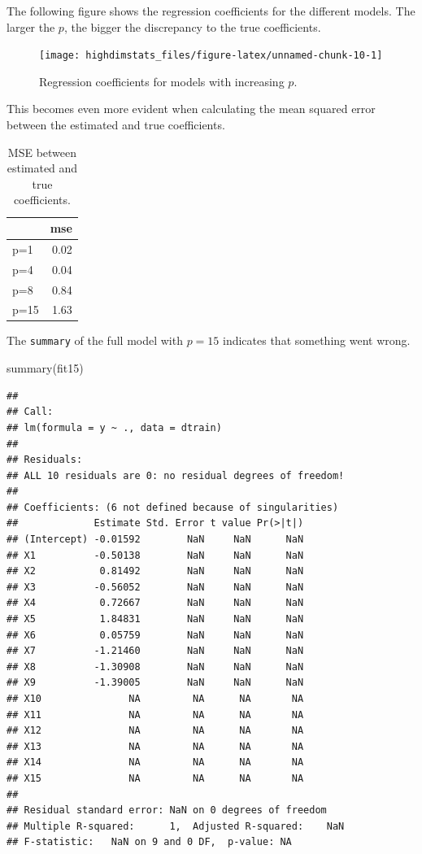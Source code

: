 \documentclass[
]{book}
\newenvironment{Shaded}{\begin{snugshade}}{\end{snugshade}}
\newcommand{\FunctionTok}[1]{\textcolor[rgb]{0.00,0.00,0.00}{#1}}
\newcommand{\NormalTok}[1]{#1}
\begin{document}
The following figure shows the regression coefficients for the different models. The larger the \(p\), the bigger the discrepancy to the true coefficients.

\begin{figure}

{\centering \texttt{[image: highdimstats\_files/figure-latex/unnamed-chunk-10-1]} 

}

\caption{Regression coefficients for models with increasing $p$.}\label{fig:unnamed-chunk-10}
\end{figure}

This becomes even more evident when calculating the mean squared error between the estimated and true coefficients.

\begin{table}

\caption{\label{tab:unnamed-chunk-11}MSE between estimated and true coefficients.}
\centering
\begin{tabular}[t]{lr}
\toprule
  & mse\\
\midrule
p=1 & 0.02\\
p=4 & 0.04\\
p=8 & 0.84\\
p=15 & 1.63\\
\bottomrule
\end{tabular}
\end{table}

The \texttt{summary} of the full model with \(p=15\) indicates that something went wrong.

\begin{Shaded}
\begin{Highlighting}[]
\FunctionTok{summary}\NormalTok{(fit15)}
\end{Highlighting}
\end{Shaded}

\begin{verbatim}
## 
## Call:
## lm(formula = y ~ ., data = dtrain)
## 
## Residuals:
## ALL 10 residuals are 0: no residual degrees of freedom!
## 
## Coefficients: (6 not defined because of singularities)
##             Estimate Std. Error t value Pr(>|t|)
## (Intercept) -0.01592        NaN     NaN      NaN
## X1          -0.50138        NaN     NaN      NaN
## X2           0.81492        NaN     NaN      NaN
## X3          -0.56052        NaN     NaN      NaN
## X4           0.72667        NaN     NaN      NaN
## X5           1.84831        NaN     NaN      NaN
## X6           0.05759        NaN     NaN      NaN
## X7          -1.21460        NaN     NaN      NaN
## X8          -1.30908        NaN     NaN      NaN
## X9          -1.39005        NaN     NaN      NaN
## X10               NA         NA      NA       NA
## X11               NA         NA      NA       NA
## X12               NA         NA      NA       NA
## X13               NA         NA      NA       NA
## X14               NA         NA      NA       NA
## X15               NA         NA      NA       NA
## 
## Residual standard error: NaN on 0 degrees of freedom
## Multiple R-squared:      1,  Adjusted R-squared:    NaN 
## F-statistic:   NaN on 9 and 0 DF,  p-value: NA
\end{verbatim}
\end{document}

